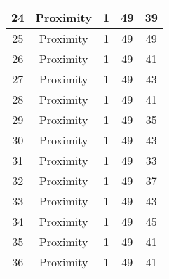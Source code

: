 \documentclass[results.tex]{subfiles}
\begin{document}
\begin{center}
\begin{tabular}{| c || c | c | c | c |}
            \hline
            24                      & Proximity                    & 1                      & 49                      & 39                   \\
            \hline
            25                      & Proximity                    & 1                      & 49                      & 49                   \\
            \hline
            26                      & Proximity                    & 1                      & 49                      & 41                   \\
            \hline
            27                      & Proximity                    & 1                      & 49                      & 43                   \\
            \hline
            28                      & Proximity                    & 1                      & 49                      & 41                   \\
            \hline
            29                      & Proximity                    & 1                      & 49                      & 35                   \\
            \hline
            30                      & Proximity                    & 1                      & 49                      & 43                   \\
            \hline
            31                      & Proximity                    & 1                      & 49                      & 33                   \\
            \hline
            32                      & Proximity                    & 1                      & 49                      & 37                   \\
            \hline
            33                      & Proximity                    & 1                      & 49                      & 43                   \\
            \hline
            34                      & Proximity                    & 1                      & 49                      & 45                   \\
            \hline
            35                      & Proximity                    & 1                      & 49                      & 41                   \\
            \hline
            36                      & Proximity                    & 1                      & 49                      & 41                   \\

\end{tabular}
\end{center}
\end{document}
